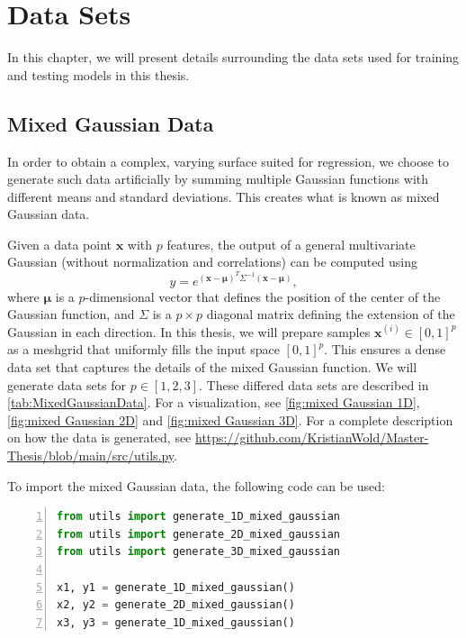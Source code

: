 \chapter{Data Sets}\label{sec:Appendix B}
In this chapter, we will present details surrounding the data sets used for training and testing models in this thesis. 

\section{Mixed Gaussian Data}\label{sec:Mixed Gaussian Data}
In order to obtain a complex, varying surface suited for regression, we choose to generate such data artificially by summing multiple Gaussian functions with different means and standard deviations. This creates what is known as mixed Gaussian data. 

Given a data point $\boldsymbol{x}$ with $p$ features, the output of a general multivariate Gaussian (without normalization and correlations) can be computed using 
\begin{equation}\label{eq:Gaussian}
    y = e^{(\boldsymbol{x} - \boldsymbol{\mu})^T \Sigma^{-1}(\boldsymbol{x} - \boldsymbol{\mu})},
\end{equation}
where $\boldsymbol{\mu}$ is a $p$-dimensional vector that defines the position of the center of the Gaussian function, and $\Sigma$ is a $p\times p$ diagonal matrix defining the extension of the Gaussian in each direction. In this thesis, we will prepare samples $\boldsymbol{x}^{(i)} \in [0,1]^p$ as a meshgrid that uniformly fills the input space $[0,1]^p$. This ensures a dense data set that captures the details of the mixed Gaussian function. We will generate data sets for $p \in[1,2,3].$ These differed data sets are described in \cref{tab:MixedGaussianData}. For a visualization, see \cref{fig:mixed Gaussian 1D}, \cref{fig:mixed Gaussian 2D} and \cref{fig:mixed Gaussian 3D}. For a complete description on how the data is generated, see \url{https://github.com/KristianWold/Master-Thesis/blob/main/src/utils.py}.

To import the mixed Gaussian data, the following code can be used:
\begin{lstlisting}[language=python, numbers=left]
from utils import generate_1D_mixed_gaussian
from utils import generate_2D_mixed_gaussian
from utils import generate_3D_mixed_gaussian

x1, y1 = generate_1D_mixed_gaussian()
x2, y2 = generate_2D_mixed_gaussian()
x3, y3 = generate_1D_mixed_gaussian()
\end{lstlisting}

